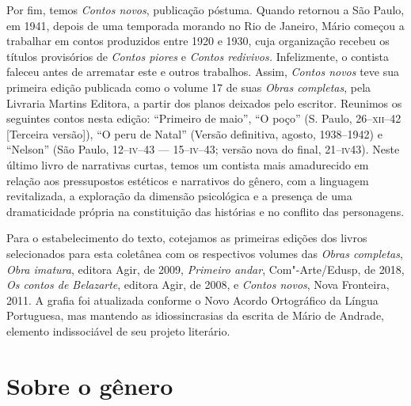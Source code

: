 Por fim, temos \emph{Contos novos}, publicação póstuma. Quando retornou
a São Paulo, em 1941, depois de uma temporada morando no Rio de Janeiro,
Mário começou a trabalhar em contos produzidos entre 1920 e 1930, cuja
organização recebeu os títulos provisórios de \emph{Contos piores} e
\emph{Contos redivivos.} Infelizmente, o contista faleceu antes de
arrematar este e outros trabalhos. Assim, \emph{Contos novos} teve sua
primeira edição publicada como o volume 17 de suas \emph{Obras
completas}, pela Livraria Martins Editora, a partir dos planos deixados
pelo escritor. Reunimos os seguintes contos nesta edição: ``Primeiro de
maio'', ``O poço'' (S. Paulo, 26--\textsc{xii}--42 {[}Terceira versão{]}), ``O peru
de Natal'' (Versão definitiva, agosto, 1938--1942) e ``Nelson'' (São
Paulo, 12--\textsc{iv}--43 --- 15--\textsc{iv}--43; versão nova do final, 21--\textsc{iv}43). %
Neste
último livro de narrativas curtas, temos um contista mais amadurecido em
relação aos pressupostos estéticos e narrativos do gênero, com a
linguagem revitalizada, a exploração da dimensão psicológica e a
presença de uma dramaticidade própria na constituição das histórias e no
conflito das personagens.

Para o estabelecimento do texto, cotejamos as primeiras edições dos
livros selecionados para esta coletânea com os respectivos volumes das
\emph{Obras completas}, \emph{Obra imatura}, editora Agir, de 2009,
\emph{Primeiro andar}, Com"-Arte/Edusp, de 2018, \emph{Os contos de
Belazarte}, editora Agir, de 2008, e \emph{Contos novos}, Nova
Fronteira, 2011. A grafia foi atualizada conforme o Novo Acordo
Ortográfico da Língua Portuguesa, mas mantendo as idiossincrasias da
escrita de Mário de Andrade, elemento indissociável de seu projeto
literário.

\section{Sobre o gênero}


